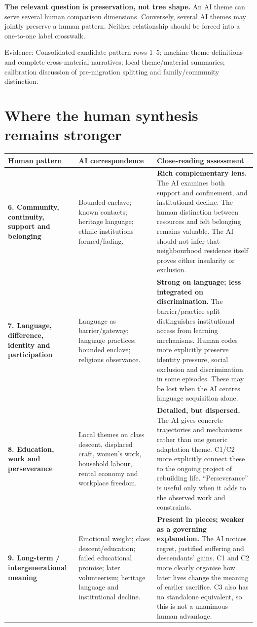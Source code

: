 \documentclass[10pt,a4paper]{article}
\newcommand{\kicker}[1]{{\sffamily\small\bfseries\color{teal}#1}\par\vspace{5pt}}
\newcommand{\source}[1]{{\footnotesize\color{muted}Evidence: #1}\par}
\newcommand{\page}[2]{\clearpage\kicker{#1}\section*{#2}}
\begin{document}
\begin{takeaway}
\textbf{The relevant question is preservation, not tree shape.} An AI theme can serve several human comparison dimensions. Conversely, several AI themes may jointly preserve a human pattern. Neither relationship should be forced into a one-to-one label crosswalk.
\end{takeaway}
\source{Consolidated candidate-pattern rows 1--5; machine theme definitions and complete cross-material narratives; local theme/material summaries; calibration discussion of pre-migration splitting and family/community distinction.}

\page{07 / CANDIDATE PATTERNS, 6--9}{Where the human synthesis remains stronger}
\begin{tabularx}{\linewidth}{@{}p{3.4cm}YY@{}}
\toprule
\textbf{Human pattern} & \textbf{AI correspondence} & \textbf{Close-reading assessment}\tabularnewline\midrule
\textbf{6. Community, continuity, support and belonging} & Bounded enclave; known contacts; heritage language; ethnic institutions formed/fading. & \textbf{Rich complementary lens.} The AI examines both support and confinement, and institutional decline. The human distinction between resources and felt belonging remains valuable. The AI should not infer that neighbourhood residence itself proves either insularity or exclusion.\tabularnewline\addlinespace
\textbf{7. Language, difference, identity and participation} & Language as barrier/gateway; language practices; bounded enclave; religious observance. & \textbf{Strong on language; less integrated on discrimination.} The barrier/practice split distinguishes institutional access from learning mechanisms. Human codes more explicitly preserve identity pressure, social exclusion and discrimination in some episodes. These may be lost when the AI centres language acquisition alone.\tabularnewline\addlinespace
\textbf{8. Education, work and perseverance} & Local themes on class descent, displaced craft, women's work, household labour, rental economy and workplace freedom. & \textbf{Detailed, but dispersed.} The AI gives concrete trajectories and mechanisms rather than one generic adaptation theme. C1/C2 more explicitly connect these to the ongoing project of rebuilding life. ``Perseverance'' is useful only when it adds to the observed work and constraints.\tabularnewline\addlinespace
\textbf{9. Long-term / intergenerational meaning} & Emotional weight; class descent/education; failed educational promise; later volunteerism; heritage language and institutional decline. & \textbf{Present in pieces; weaker as a governing explanation.} The AI notices regret, justified suffering and descendants' gains. C1 and C2 more clearly organise how later lives change the meaning of earlier sacrifice. C3 also has no standalone equivalent, so this is not a unanimous human advantage.\tabularnewline\bottomrule
\end{tabularx}
\end{document}
